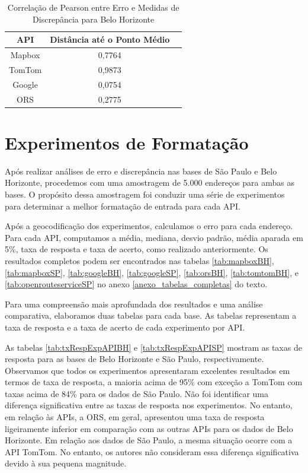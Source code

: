 \begin{table}[!ht]
    \centering
    \caption{Correlação de Pearson entre Erro e Medidas de Discrepância para Belo Horizonte}
    \label{tab:correlationBH}
    \begin{adjustbox}{width=0.7\textwidth}
    \begin{tabular}{|c|c|c|}
    \hline
    API & Distância até o Ponto Médio \\
    \hline
    Mapbox & 0,7764 \\
    TomTom & 0,9873 \\
    Google & 0,0754 \\
    ORS & 0,2775 \\
    \hline
    \end{tabular}
    \end{adjustbox}
\end{table}

\section{Experimentos de Formatação}

Após realizar análises de erro e discrepância nas bases de São Paulo e Belo Horizonte, procedemos com uma amostragem de 5.000 endereços para ambas as bases. O propósito dessa amostragem foi conduzir uma série de experimentos para determinar a melhor formatação de entrada para cada API.

Após a geocodificação dos experimentos, calculamos o erro para cada endereço. Para cada API, computamos a média, mediana, desvio padrão, média aparada em 5\%, taxa de resposta e taxa de acerto, como realizado anteriormente. Os resultados completos podem ser encontrados nas tabelas \ref{tab:mapboxBH}, \ref{tab:mapboxSP}, \ref{tab:googleBH}, \ref{tab:googleSP}, \ref{tab:orsBH}, \ref{tab:tomtomBH}, e \ref{tab:openrouteserviceSP} no anexo \ref{anexo_tabelas_completas} do texto.

Para uma compreensão mais aprofundada dos resultados e uma análise comparativa, elaboramos duas tabelas para cada base. As tabelas representam a taxa de resposta e a taxa de acerto de cada experimento por API.

As tabelas \ref{tab:txRespExpAPIBH} e \ref{tab:txRespExpAPISP} mostram as taxas de resposta para as bases de Belo Horizonte e São Paulo, respectivamente. Observamos que todos os experimentos apresentaram excelentes resultados em termos de taxa de resposta, a maioria acima de 95\% com exceção a TomTom com taxas acima de 84\% para os dados de São Paulo. Não foi identificar uma diferença significativa entre as taxas de resposta nos experimentos. No entanto, em relação às APIs, a ORS, em geral, apresentou uma taxa de resposta ligeiramente inferior em comparação com as outras APIs para os dados de Belo Horizonte. Em relação aos dados de São Paulo, a mesma situação ocorre com a API TomTom. No entanto, os autores não consideram essa diferença significativa devido à sua pequena magnitude.
 

